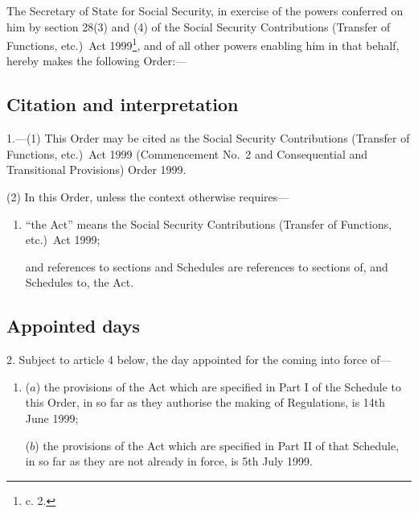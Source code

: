 \documentclass[12pt,a4paper]{article}
\title{\regstitle}
\author{S.I. 1999 No. 1662 (C.47)}
\date{Made
13th June 1999\\
}
\begin{document}
\maketitle

\noindent
The Secretary of State for Social Security, in exercise of the powers conferred on him by section 28(3) and (4) of the Social Security Contributions (Transfer of Functions, etc.)\ Act 1999\footnote{ c. 2.}, and of all other powers enabling him in that behalf, hereby makes the following Order:— 

{\sloppy

\tableofcontents

}

\bigskip

\setcounter{secnumdepth}{-2}

\subsection[1. Citation and interpretation]{Citation and interpretation}

1.---(1)  This Order may be cited as the Social Security Contributions (Transfer of Functions, etc.)\ Act 1999 (Commencement No.\ 2 and Consequential and Transitional Provisions) Order 1999.

(2) In this Order, unless the context otherwise requires—
\begin{enumerate}\item[]
“the Act” means the Social Security Contributions (Transfer of Functions, etc.)\ Act 1999;

and references to sections and Schedules are references to sections of, and Schedules to, the Act.
\end{enumerate}

\subsection[2. Appointed days]{Appointed days}

2.  Subject to article 4 below, the day appointed for the coming into force of—
\begin{enumerate}\item[]
($a$) the provisions of the Act which are specified in Part I of the Schedule to this Order, in so far as they authorise the making of Regulations, is 14th June 1999;

($b$) the provisions of the Act which are specified in Part II of that Schedule, in so far as they are not already in force, is 5th July 1999.
\end{enumerate}
\end{document}
